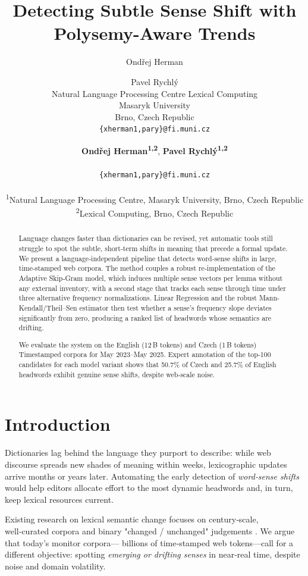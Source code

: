 \documentclass[11pt]{article}
\title{Detecting Subtle Sense Shift with Polysemy-Aware Trends}
\author{Ondřej Herman \and Pavel Rychlý \\

  Natural Language Processing Centre \And Lexical Computing \\ 
  Masaryk University \\
  Brno, Czech Republic\\
  \texttt{\{xherman1,pary\}@fi.muni.cz}
}
\author{
\textbf{Ondřej Herman\textsuperscript{1,2}},
\textbf{Pavel Rychlý\textsuperscript{1,2}}
\\
\\
\texttt{\{xherman1,pary\}@fi.muni.cz}
\\
\\
\textsuperscript{1}Natural Language Processing Centre, Masaryk University, Brno, Czech Republic\\
\textsuperscript{2}Lexical Computing, Brno, Czech Republic
}
\begin{document}
\maketitle
\begin{abstract}

Language changes faster than dictionaries can be revised, yet automatic tools still struggle to spot the subtle, short‑term shifts in meaning that precede a formal update. We present a language‑independent pipeline that detects word‑sense shifts in large, time‑stamped web corpora. The method couples a robust re‑implementation of the Adaptive Skip‑Gram model, which induces multiple sense vectors per lemma without any external inventory, with a second stage that tracks each sense through time under three alternative frequency normalizations. Linear Regression and the robust Mann-Kendall/Theil–Sen estimator then test whether a sense’s frequency slope deviates significantly from zero, producing a ranked list of headwords whose semantics are drifting.
                                                                              
We evaluate the system on the English (12\,B tokens) and Czech (1\,B tokens) Timestamped corpora for May 2023–May 2025. Expert annotation of the top‑100 candidates for each model variant shows that 50.7\% of Czech and 25.7\% of English headwords exhibit genuine sense shifts, despite web‑scale noise.

\end{abstract}

\section{Introduction}
Dictionaries lag behind the language they purport to describe: while
web discourse spreads new shades of meaning within weeks,
lexicographic updates arrive months or years later.
Automating the early detection of \emph{word‑sense shifts}
would help editors allocate effort to the most dynamic headwords
and, in turn, keep lexical resources current.

Existing research on lexical semantic change
focuses on century‑scale, well‑curated corpora
and binary "changed / unchanged" judgements
\citep{schlechtweg2023human,tahmasebi2023computationalmodelingsemanticchange}.
We argue that today’s monitor corpora—
billions of time‑stamped web tokens—call for a
different objective: spotting \emph{emerging or drifting senses}
in near‑real time, despite noise and domain volatility.
\end{document}
